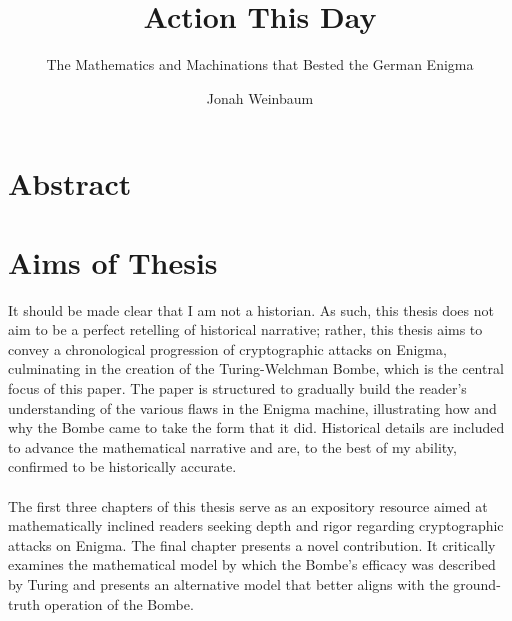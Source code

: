 \documentclass{dcthesis}
\title{Action This Day}
\subtitle{The Mathematics and Machinations that Bested the German Enigma}
\author{Jonah Weinbaum}
\theoremstyle{definition}
\theoremstyle{remark}
\begin{document}
\frontmatter

\maketitle
\restoregeometry


\tableofcontents





\chapter*{Abstract}

\chapter*{Aims of Thesis}
It should be made clear that I am not a historian. As such, this thesis does not aim to be a perfect retelling of historical narrative; rather, this thesis aims to convey a chronological progression of cryptographic attacks on Enigma, culminating in the creation of the Turing-Welchman Bombe, which is the central focus of this paper. The paper is structured to gradually build the reader's understanding of the various flaws in the Enigma machine, illustrating how and why the Bombe came to take the form that it did.  Historical details are included to advance the mathematical narrative and are, to the best of my ability, confirmed to be historically accurate.
\\\\The first three chapters of this thesis serve as an expository resource aimed at mathematically inclined readers seeking depth and rigor regarding cryptographic attacks on Enigma. The final chapter presents a novel contribution. It critically examines the mathematical model by which the Bombe's efficacy was described by Turing and presents an alternative model that better aligns with the ground-truth operation of the Bombe.
\end{document}
